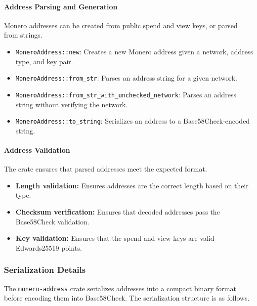 \paragraph{Address Parsing and Generation}

Monero addresses can be created from public spend and view keys, or parsed from strings. %

\begin{itemize}
    \item \texttt{MoneroAddress::new}: Creates a new Monero address given a network, address type, and key pair.  
    \item \texttt{MoneroAddress::from\_str}: Parses an address string for a given network.  
    \item \texttt{MoneroAddress::from\_str\_with\_unchecked\_network}: Parses an address string without verifying the network.  
    \item \texttt{MoneroAddress::to\_string}: Serializes an address to a Base58Check-encoded string.  
\end{itemize}

\paragraph{Address Validation}

The crate ensures that parsed addresses meet the expected format. %

\begin{itemize}
    \item \textbf{Length validation:} Ensures addresses are the correct length based on their type.  
    \item \textbf{Checksum verification:} Ensures that decoded addresses pass the Base58Check validation.  
    \item \textbf{Key validation:} Ensures that the spend and view keys are valid Edwards25519 points.  
\end{itemize}

\subsubsection{Serialization Details}

The \texttt{monero-address} crate serializes addresses into a compact binary format before encoding them into Base58Check.  The serialization structure is as follows. %

